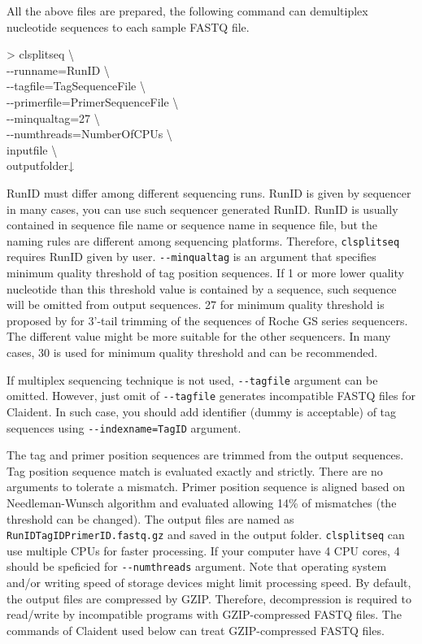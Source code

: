 \documentclass[titlepage,10pt,a4paper,english]{jsbook}
\newenvironment{cmd}{\begin{oframed}\raggedright\ttfamily\footnotesize\setlength{\baselineskip}{1.4em}}{\end{oframed}\vspace{-1em}}
\begin{document}
All the above files are prepared, the following command can demultiplex nucleotide sequences to each sample FASTQ file.
\begin{cmd}
{\textgreater} clsplitseq {\textbackslash}\\
{-}{-}runname=RunID {\textbackslash}\\
{-}{-}tagfile=TagSequenceFile {\textbackslash}\\
{-}{-}primerfile=PrimerSequenceFile {\textbackslash}\\
{-}{-}minqualtag=27 {\textbackslash}\\
{-}{-}numthreads=NumberOfCPUs {\textbackslash}\\
inputfile {\textbackslash}\\
outputfolder↓
\end{cmd}
RunID must differ among different sequencing runs.
RunID is given by sequencer in many cases, you can use such sequencer generated RunID.
RunID is usually contained in sequence file name or sequence name in sequence file, but the naming rules are different among sequencing platforms.
Therefore, \texttt{clsplitseq} requires RunID given by user.
\texttt{{-}{-}minqualtag} is an argument that specifies minimum quality threshold of tag position sequences.
If 1 or more lower quality nucleotide than this threshold value is contained by a sequence, such sequence will be omitted from output sequences.
27 for minimum quality threshold is proposed by \citet{Kunin2010} for 3'-tail trimming of the sequences of Roche GS series sequencers.
The different value might be more suitable for the other sequencers.
In many cases, 30 is used for minimum quality threshold and can be recommended.

If multiplex sequencing technique is not used, \texttt{{-}{-}tagfile} argument can be omitted.
However, just omit of \texttt{{-}{-}tagfile} generates incompatible FASTQ files for Claident.
In such case, you should add identifier (dummy is acceptable) of tag sequences using \texttt{{-}{-}indexname=TagID} argument.

The tag and primer position sequences are trimmed from the output sequences.
Tag position sequence match is evaluated exactly and strictly.
There are no arguments to tolerate a mismatch.
Primer position sequence is aligned based on Needleman-Wunsch algorithm and evaluated allowing 14\% of mismatches (the threshold can be changed).
The output files are named as \texttt{RunID{\textunderscore}{\textunderscore}TagID{\textunderscore}{\textunderscore}PrimerID.fastq.gz} and saved in the output folder.
\texttt{clsplitseq} can use multiple CPUs for faster processing.
If your computer have 4 CPU cores, 4 should be speficied for \texttt{{-}{-}numthreads} argument.
Note that operating system and/or writing speed of storage devices might limit processing speed.
By default, the output files are compressed by GZIP.
Therefore, decompression is required to read/write by incompatible programs with GZIP-compressed FASTQ files.
The commands of Claident used below can treat GZIP-compressed FASTQ files.
\end{document}
